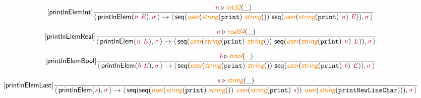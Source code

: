 \documentclass[10pt,leqno,fleqn]{article}
\newcommand{\artVariable}[1]{\mbox{\color{purple}\em #1\/}}
\newcommand{\artConstructor}[1]{\mbox{\sf #1}}
\newcommand{\artCaseInsensitiveLiteral}[1]{\mbox{\tt #1}}
\newcommand{\artSpecial}[1]{\mbox{\color{orange}\sf\em #1}}
\begin{document}
\begin{equation}
\tag*{[\artConstructor{\sf printlnElemInt}]}
\begin{split}\frac{ \artVariable{n}\triangleright \artSpecial{int32}(\_) }{\langle\, \artConstructor{\sf printlnElem}(\artVariable{n}\ \artVariable{E}), \artVariable{$\sigma$}\,\rangle \rightarrow \langle\, \artConstructor{\sf seq}(\artSpecial{user}(\artSpecial{string}(\artCaseInsensitiveLiteral{print})\ \artSpecial{string}(\artCaseInsensitiveLiteral{ }))\ \artConstructor{\sf seq}(\artSpecial{user}(\artSpecial{string}(\artCaseInsensitiveLiteral{print})\ \artVariable{n})\ \artVariable{E})), \artVariable{$\sigma$}\,\rangle }
\end{split}
\end{equation}

\begin{equation}
\tag*{[\artConstructor{\sf printlnElemReal}]}
\begin{split}\frac{ \artVariable{n}\triangleright \artSpecial{real64}(\_) }{\langle\, \artConstructor{\sf printlnElem}(\artVariable{n}\ \artVariable{E}), \artVariable{$\sigma$}\,\rangle \rightarrow \langle\, \artConstructor{\sf seq}(\artSpecial{user}(\artSpecial{string}(\artCaseInsensitiveLiteral{print})\ \artSpecial{string}(\artCaseInsensitiveLiteral{ }))\ \artConstructor{\sf seq}(\artSpecial{user}(\artSpecial{string}(\artCaseInsensitiveLiteral{print})\ \artVariable{n})\ \artVariable{E})), \artVariable{$\sigma$}\,\rangle }
\end{split}
\end{equation}

\begin{equation}
\tag*{[\artConstructor{\sf printlnElemBool}]}
\begin{split}\frac{ \artVariable{b}\triangleright \artSpecial{bool}(\_) }{\langle\, \artConstructor{\sf printlnElem}(\artVariable{b}\ \artVariable{E}), \artVariable{$\sigma$}\,\rangle \rightarrow \langle\, \artConstructor{\sf seq}(\artSpecial{user}(\artSpecial{string}(\artCaseInsensitiveLiteral{print})\ \artSpecial{string}(\artCaseInsensitiveLiteral{ }))\ \artConstructor{\sf seq}(\artSpecial{user}(\artSpecial{string}(\artCaseInsensitiveLiteral{print})\ \artVariable{b})\ \artVariable{E})), \artVariable{$\sigma$}\,\rangle }
\end{split}
\end{equation}

\begin{equation}
\tag*{[\artConstructor{\sf printlnElemLast}]}
\begin{split}\frac{ \artVariable{s}\triangleright \artSpecial{string}(\_) }{\langle\, \artConstructor{\sf printlnElem}(\artVariable{s}), \artVariable{$\sigma$}\,\rangle \rightarrow \langle\, \artConstructor{\sf seq}(\artConstructor{\sf seq}(\artSpecial{user}(\artSpecial{string}(\artCaseInsensitiveLiteral{print})\ \artSpecial{string}(\artCaseInsensitiveLiteral{ }))\ \artSpecial{user}(\artSpecial{string}(\artCaseInsensitiveLiteral{print})\ \artVariable{s}))\ \artSpecial{user}(\artSpecial{string}(\artCaseInsensitiveLiteral{printNewLineChar}))), \artVariable{$\sigma$}\,\rangle }
\end{split}
\end{equation}
\end{document}
